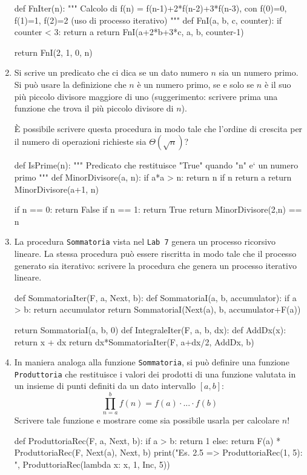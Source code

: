 \documentclass[11pt,a4]{article}
\begin{document}
\begin{enumerate}
\begin{python}
def FnIter(n):
    """ Calcolo di f(n)  = f(n-1)+2*f(n-2)+3*f(n-3), con f(0)=0, f(1)=1, f(2)=2 
        (uso di processo iterativo) """
    def FnI(a, b, c, counter):
        if counter < 3:
            return a
        return FnI(a+2*b+3*c, a, b, counter-1)
    
    return FnI(2, 1, 0, n)
\end{python}

\item Si scrive un predicato che ci dica se un dato numero $n$ sia un numero primo.
Si può usare la definizione che $n$ è un numero primo, se e solo se $n$ è il suo più piccolo divisore maggiore di uno
(suggerimento: scrivere prima una funzione che trova il più piccolo divisore di $n$).

È possibile scrivere questa procedura in modo tale che l'ordine di crescita per il numero di operazioni richieste sia $\Theta(\sqrt{n})$?
\begin{python}
def IsPrime(n):
    """ Predicato che restituisce "True" quando "n" e` un numero primo """
    def MinorDivisore(a, n):
        if a*a > n:
            return n
        if n %
            return a
        return MinorDivisore(a+1, n)
    
    if n == 0:
        return False
    if n == 1:
        return True
    return MinorDivisore(2,n) == n
\end{python}
 
\item La procedura {\tt Sommatoria} vista nel {\tt Lab 7} genera un processo ricorsivo lineare.
La stessa procedura può essere riscritta in modo tale che il processo generato sia iterativo:
scrivere la procedura che genera un processo iterativo lineare.
\begin{python}
def SommatoriaIter(F, a, Next, b):
    def SommatoriaI(a, b, accumulator):
        if a > b:
            return accumulator
        return SommatoriaI(Next(a), b, accumulator+F(a))
    
    return SommatoriaI(a, b, 0)    
def IntegraleIter(F, a, b, dx):
    def AddDx(x):
        return x + dx
    return dx*SommatoriaIter(F, a+dx/2, AddDx, b)
\end{python}

\item In maniera analoga alla funzione {\tt Sommatoria}, si può definire una funzione {\tt Produttoria}
che restituisce i valori dei prodotti di una funzione valutata in un insieme di punti definiti da un dato intervallo $[a,b]$:
$$
	\prod_{n=a}^b f(n) = f(a)\cdot ... \cdot f(b)
$$
Scrivere tale funzione e mostrare come sia possibile usarla per calcolare $n!$
\begin{python}
def ProduttoriaRec(F, a, Next, b):
    if a > b:
        return 1
    else:
        return F(a) * ProduttoriaRec(F, Next(a), Next, b)
print("Es. 2.5 => ProduttoriaRec(1, 5): ", ProduttoriaRec(lambda x: x, 1, Inc, 5))
\end{python}


\end{enumerate}
\end{document}
